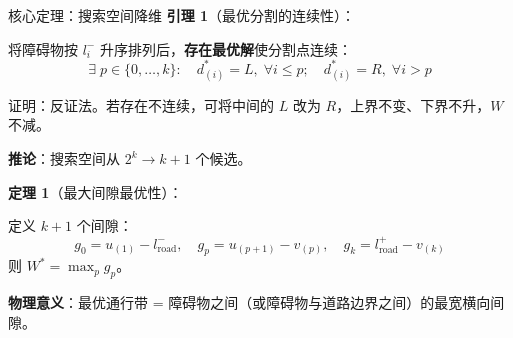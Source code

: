 \documentclass[aspectratio=169,10pt,fontset=none]{ctexbeamer}
\begin{document}
\begin{frame}{核心定理：搜索空间降维}
  \textbf{引理 1}（最优分割的连续性）：

  将障碍物按 $l_i^-$ 升序排列后，\textbf{存在最优解}使分割点连续：
  \[
    \exists\; p \in \{0,\dots,k\}:\quad
    d_{(i)}^* = L,\;\forall i \le p;\quad d_{(i)}^* = R,\;\forall i > p
  \]

  {\small\color{gray} 证明：反证法。若存在不连续，可将中间的 $L$ 改为 $R$，上界不变、下界不升，$W$ 不减。}

  \vspace{0.3cm}
  
  \textbf{推论}：搜索空间从 $2^k \to k+1$ 个候选。

  \vspace{0.3cm}
  \textbf{定理 1}（最大间隙最优性）：

  定义 $k+1$ 个间隙：
  \[
    g_0 = u_{(1)} - l_{\text{road}}^-,\quad
    g_p = u_{(p+1)} - v_{(p)},\quad
    g_k = l_{\text{road}}^+ - v_{(k)}
  \]
  则 $W^* = \max_p g_p$。

  \vspace{0.2cm}
  \textbf{物理意义}：\textcolor{apoblue}{最优通行带 = 障碍物之间（或障碍物与道路边界之间）的最宽横向间隙}。
\end{frame}
\end{document}
